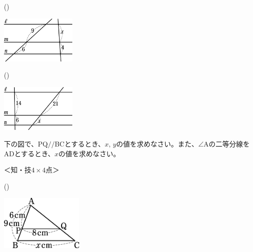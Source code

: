 \documentclass[
  12pt,a4paper,lualatex,ja=standard]{bxjsarticle}
\begin{document}
\begin{flushleft}
\begin{multicols}{2}
\end{multicols}

\vspace{15mm}

\begin{multicols}{2}

()\hspace{2.5pt}

\def\@captype{figure}
\includegraphics[width=10em]{toi3.jpg}


\columnbreak

()\hspace{2.5pt}

\def\@captype{figure}
\includegraphics[width=10em]{toi4.jpg}


\end{multicols}
\vfill

\newpage

\setcounter{skaunta}{0}

\noindent{} \hspace{1pt}下の図で、PQ$/\!/$BCとするとき、$x, \, y$の値を求めなさい。また、$\angle$Aの二等分線をADとするとき、$x$の値を求めなさい。

%
\begin{flushright}%
\footnotesize{＜知・技$4\times 4$点＞}%
\end{flushright}%


\begin{multicols}{2}
()\hspace{2.5pt}

\def\@captype{figure}
\includegraphics[width=11em]{ttoi1.jpg}



\end{multicols}
\end{flushleft}
\end{document}
